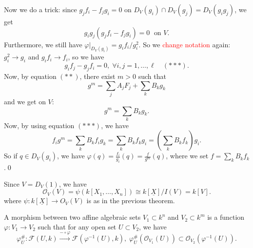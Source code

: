 Now we do a trick: since $g_jf_i - f_jg_i = 0$ on $D_V(g_i)\cap D_V(g_j)=D_V(g_ig_j)$, we get 
\begin{equation}
    g_ig_j(g_jf_i-f_jg_i) = 0\;\text{ on }V.
\end{equation}
Furthermore, we still have $\varphi\big|_{D_V(g_i)}=g_if_i / g_i^2$.
So we \textcolor{red}{change notation} again: $g_i^2\to g_i$ and $g_if_i\to f_i$, so we have 
\begin{equation}
    g_if_j - g_jf_i = 0,\;\forall i,j=1,\dots,\ell\quad (***).
\end{equation}
Now, by equation $(**)$, there exist $m>0$ such that 
\begin{equation}
    g^m = \sum_jA_jF_j + \sum_kB_kg_k 
\end{equation}
and we get on $V$:
\begin{equation}
    g^m = \sum_k B_kg_k.
\end{equation}
Now, by using equation $(***)$, we have 
\begin{equation}
    f_ig^m = \sum_kB_kf_ig_k = \sum_kB_kf_kg_i = (\sum_kB_kf_k)g_i.
\end{equation}
So if $q\in D_V(g_i)$, we have $\varphi(q) = \tfrac{f_i}{g_i}(q)=\tfrac{f}{g^m}(q)$, where we set $f=\sum_kB_kf_k$.\qed

\begin{dang}
    \begin{corollary}
        Since $V=D_V(1)$, we have 
        \begin{equation}
            \mathcal{O}_V(V)=\psi(k[X_1,\dots,X_n])\cong k[\underline{X}]/I(V) = k[V].
        \end{equation}
        where $\psi: k[\underline{X}]\to O_V(V)$ is as in the previous theorem.
    \end{corollary}
\end{dang}

\begin{dang}
    \begin{definition}
        A morphism between two affine algebraic sets $V_1\subset k^n$ and $V_2\subset k^m$ is a function 
        $\varphi:V_1\to V_2$ such that for any open set $U\subset V_2$, we have 
        \begin{equation}
            \varphi_U^{\#}:\mathcal{F}(U,k)\overset{-\circ\varphi}{\rightarrow}\mathcal{F}(\varphi^{-1}(U),k),\;
            \varphi_U^{\#}(\mathcal{O}_{V_1}(U))\subset \mathcal{O}_{V_2}(\varphi^{-1}(U)).
        \end{equation}
    \end{definition}
\end{dang}

